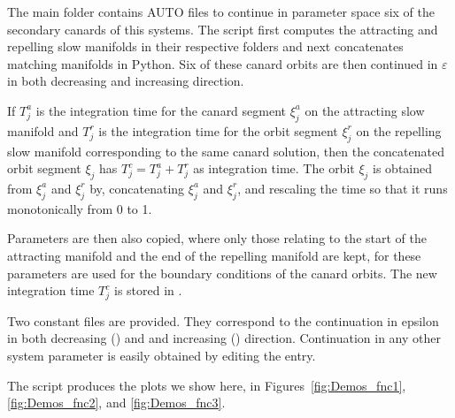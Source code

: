 \documentclass[12pt]{report}
\begin{document}
The main folder contains AUTO files to continue in 
parameter space six of the secondary canards of this systems. The
script  first computes the attracting and
repelling slow manifolds in their respective folders and next
concatenates matching manifolds in Python.  Six of these canard
orbits are then continued in $\varepsilon$ in both decreasing and
increasing direction.

If $T^a_j$ is the integration time for the canard segment $\xi^a_j$ on the 
attracting slow manifold and $T^r_j$ is the integration time for the orbit 
segment $\xi^r_j$ on the repelling slow manifold corresponding to the same 
canard solution, then the concatenated orbit segment $\xi_j$ has
$T^c_j=T^a_j+T^r_j$ as integration time.
The orbit $\xi_j$ is obtained from $\xi^a_j$ and $\xi^r_j$ by,
concatenating $\xi^a_j$ and $\xi^r_j$, and rescaling the time
so that it runs monotonically from 0 to 1.

Parameters are then also copied, where only those relating to the
start of the attracting manifold and the end of the repelling manifold
are kept, for these parameters are used for the boundary conditions of
the canard orbits. The new integration time $T^c_j$ is stored in
.

Two constant files are provided. They correspond to the continuation
in epsilon in both decreasing () and
and increasing () direction.
Continuation in any other system parameter is 
easily obtained by editing the  entry.

The script  produces the plots
we show here, in Figures~\ref{fig:Demos_fnc1},
\ref{fig:Demos_fnc2}, and \ref{fig:Demos_fnc3}.
\end{document}
